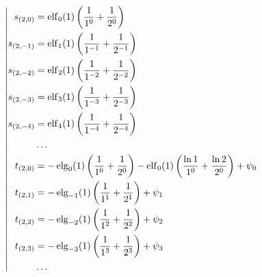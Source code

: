 \begin{equation*} \left| \begin{aligned}
s_{(2,0)} &=
  \elf_0(1) \left(
  \frac{1}{1^0}
+ \frac{1}{2^0} \right) \\
%
s_{(2,-1)} &=
  \elf_1(1) \left(
  \frac{1}{1^{-1}}
+ \frac{1}{2^{-1}} \right) \\
%
s_{(2,-2)} &=
  \elf_2(1) \left(
  \frac{1}{1^{-2}}
+ \frac{1}{2^{-2}} \right) \\
%
s_{(2,-3)} &=
  \elf_3(1) \left(
  \frac{1}{1^{-3}}
+ \frac{1}{2^{-3}} \right) \\
%
s_{(2,-4)} &=
  \elf_4(1) \left(
  \frac{1}{1^{-4}}
+ \frac{1}{2^{-4}} \right) \\
%
&\ldots \\
%
t_{(2,0)} &=
- \elg_0(1) \left(
  \frac{1}{1^0}
+ \frac{1}{2^0} \right)
- \elf_0(1) \left(
  \frac{\ln{1}}{1^0}
+ \frac{\ln{2}}{2^0} \right)
+ \psi_0 \\
%
t_{(2,1)} &=
- \elg_{-1}(1) \left(
  \frac{1}{1^1}
+ \frac{1}{2^1} \right)
+ \psi_1 \\
%
t_{(2,2)} &=
- \elg_{-2}(1) \left(
  \frac{1}{1^2}
+ \frac{1}{2^2} \right)
+ \psi_2 \\
%
t_{(2,3)} &=
- \elg_{-3}(1) \left(
  \frac{1}{1^3}
+ \frac{1}{2^3} \right)
+ \psi_3 \\
%
&\ldots \\
\end{aligned} \right. \end{equation*}


